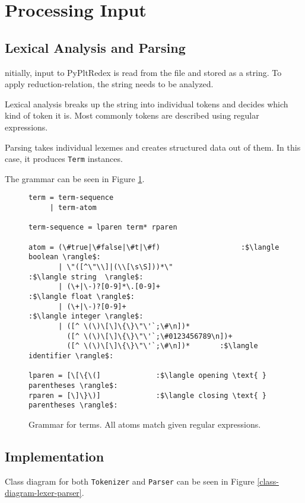 \section{Processing Input}


\subsection{Lexical Analysis and Parsing}
nitially, input to PyPltRedex is read from the file and stored as a string. To apply reduction-relation, the string needs to be analyzed.

Lexical analysis breaks up the string into individual tokens and decides which kind of token it is. Most commonly tokens are described using regular expressions. 

Parsing takes individual lexemes and creates structured data out of them. In this case, it produces \texttt{Term} instances. 

The grammar can be seen in Figure \ref{tok-lex-grammar}.

\begin{figure}[h]
\begin{verbatim}
term = term-sequence 
     | term-atom

term-sequence = lparen term* rparen

atom = (\#true|\#false|\#t|\#f)					  :$\langle boolean \rangle$:
	   | \"([^\"\\]|(\\[\s\S]))*\"				   :$\langle string  \rangle$:
	   | (\+|\-)?[0-9]*\.[0-9]+					    :$\langle float \rangle$:
	   | (\+|\-)?[0-9]+							        :$\langle integer \rangle$:
	   | ([^ \(\)\[\]\{\}\"\'`;\#\n])*
	     ([^ \(\)\[\]\{\}\"\'`;\#0123456789\n])+ 
	     ([^ \(\)\[\]\{\}\"\'`;\#\n])*       :$\langle identifier \rangle$:

lparen = [\[\{\(]             :$\langle opening \text{ } parentheses \rangle$:
rparen = [\]\}\)]             :$\langle closing \text{ } parentheses \rangle$:
\end{verbatim} 
\caption{Grammar for terms. All atoms match given regular expressions.}
\label{tok-lex-grammar}
\end{figure}

\subsection{Implementation}
Class diagram for both \texttt{Tokenizer} and \texttt{Parser} can be seen in Figure \ref{class-diagram-lexer-parser}.

